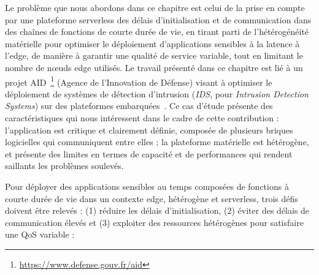 Le problème que nous abordons dans ce chapitre est celui de la prise en compte par une plateforme serverless des délais d'initialisation et de communication dans des chaînes de fonctions de courte durée de vie, en tirant parti de l'hétérogénéité matérielle pour optimiser le déploiement d'applications sensibles à la latence à l'edge, de manière à garantir une qualité de service variable, tout en limitant le nombre de nœuds edge utilisés. Le travail présenté dans ce chapitre est lié à un projet AID~\footnote{\href{https://www.defense.gouv.fr/aid}{https://www.defense.gouv.fr/aid}} (Agence de l'Innovation de Défense) visant à optimiser le déploiement de systèmes de détection d'intrusion (\textit{IDS}, pour \textit{Intrusion Detection Systems}) sur des plateformes embarquées~\cite{SLIMANI2024}. Ce cas d'étude présente des caractéristiques qui nous intéressent dans le cadre de cette contribution : l'application est critique et clairement définie, composée de plusieurs briques logicielles qui communiquent entre elles ; la plateforme matérielle est hétérogène, et présente des limites en termes de capacité et de performances qui rendent saillants les problèmes soulevés.

Pour déployer des applications sensibles au temps composées de fonctions à courte durée de vie dans un contexte edge, hétérogène et serverless, trois défis doivent être relevés : (1) réduire les délais d'initialisation, (2) éviter des délais de communication élevés et (3) exploiter des ressources hétérogènes pour satisfaire une \gls{QoS} variable :

